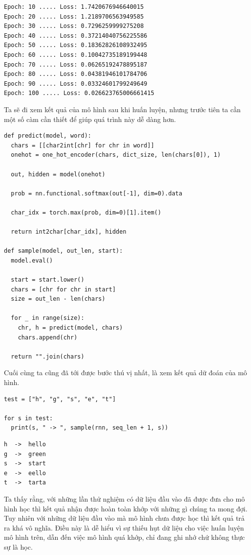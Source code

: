 \documentclass[a4paper]{article}
\begin{document}
\begin{verbatim}
Epoch: 10 ..... Loss: 1.7420676946640015
Epoch: 20 ..... Loss: 1.2189706563949585
Epoch: 30 ..... Loss: 0.7296259999275208
Epoch: 40 ..... Loss: 0.37214040756225586
Epoch: 50 ..... Loss: 0.18362826108932495
Epoch: 60 ..... Loss: 0.10042735189199448
Epoch: 70 ..... Loss: 0.06265192478895187
Epoch: 80 ..... Loss: 0.04381946101784706
Epoch: 90 ..... Loss: 0.03324601799249649
Epoch: 100 ..... Loss: 0.026623765006661415
\end{verbatim}
Ta sẽ đi xem kết quả của mô hình sau khi huấn luyện, nhưng trước tiên ta cần một số càm cần thiết để giúp quá trình này dễ dàng hơn.
\begin{lstlisting}
def predict(model, word):
  chars = [[char2int[chr] for chr in word]]
  onehot = one_hot_encoder(chars, dict_size, len(chars[0]), 1)

  out, hidden = model(onehot)

  prob = nn.functional.softmax(out[-1], dim=0).data

  char_idx = torch.max(prob, dim=0)[1].item()

  return int2char[char_idx], hidden
  
def sample(model, out_len, start):
  model.eval()

  start = start.lower()
  chars = [chr for chr in start]
  size = out_len - len(chars)

  for _ in range(size):
    chr, h = predict(model, chars)
    chars.append(chr)

  return "".join(chars)
\end{lstlisting}
Cuối cùng ta cũng đã tới được bước thú vị nhất, là xem kết quả dữ đoán của mô hình.
\begin{lstlisting}
test = ["h", "g", "s", "e", "t"]

for s in test:
  print(s, " -> ", sample(rnn, seq_len + 1, s))
\end{lstlisting}
\begin{verbatim}
h  ->  hello
g  ->  green
s  ->  start
e  ->  eello
t  ->  tarta
\end{verbatim}
Ta thấy rằng, với những lần thử nghiệm có dữ liệu đầu vào đã được đưa cho mô hình học thì kết quả nhận được hoàn toàn khớp với những gì chúng ta mong đợi. Tuy nhiên với những dữ liệu đầu vào mà mô hình chưa được học thì kết quả trả ra khá vô nghĩa. Điều này là dễ hiểu vì sự thiếu hụt dữ liệu cho việc huấn luyện mô hình trên, dẫn đến việc mô hình quá khớp, chỉ đang ghi nhớ chứ không thực sự là học.
\end{document}
